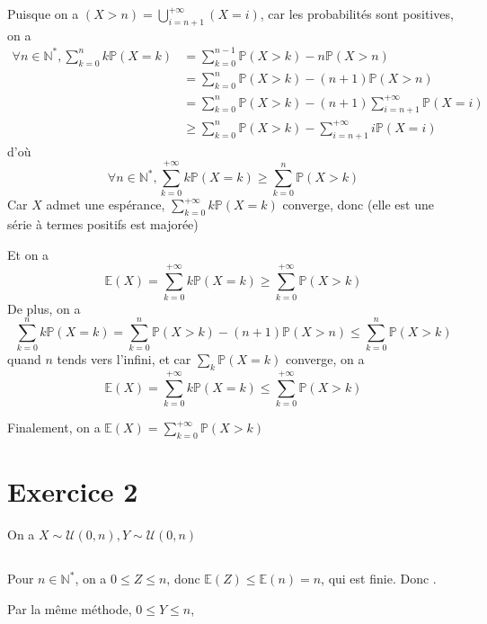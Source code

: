 \documentclass[a4paper,12pt]{book}
\begin{document}
Puisque on a $(X>n)=\bigcup_{i=n+1}^{+\infty}(X=i)$, car les probabilités sont positives, on a  
\begin{align*}
    \forall n \in \mathbb{N}^{*}, \sum_{k=0}^n k\mathbb{P}(X=k)&=\sum_{k=0}^{n-1}\mathbb{P}(X>k)-n\mathbb{P}(X>n)\\
                                 &=\sum_{k=0}^{n}\mathbb{P}(X>k)-(n+1)\mathbb{P}(X>n)\\
                                 &=\sum_{k=0}^{n}\mathbb{P}(X>k)-(n+1)\sum_{i=n+1}^{+\infty}\mathbb{P}(X=i)\\
                                 &\geq \sum_{k=0}^{n}\mathbb{P}(X>k)-\sum_{i=n+1}^{+\infty}i\mathbb{P}(X=i)
\end{align*}
d'où 
$$
\forall n \in \mathbb{N}^{*}, \sum_{k=0}^{+\infty} k\mathbb{P}(X=k) \geq \sum_{k=0}^{n}\mathbb{P}(X>k)
$$
Car $X$ admet une espérance, $\sum_{k=0}^{+\infty} k\mathbb{P}(X=k)$ converge, donc 
(elle est une série à termes positifs est majorée)

Et on a 
$$
\mathbb{E}(X)=\sum_{k=0}^{+\infty} k\mathbb{P}(X=k)\geq \sum_{k=0}^{+\infty} \mathbb{P}(X>k)
$$
De plus, on a 
$$
\sum_{k=0}^n k\mathbb{P}(X=k)=\sum_{k=0}^{n}\mathbb{P}(X>k)-(n+1)\mathbb{P}(X>n) \leq \sum_{k=0}^{n}\mathbb{P}(X>k)
$$
quand $n$ tends vers l'infini, et car $\sum_k \mathbb{P}(X=k)$ converge, on a 
$$
\mathbb{E}(X)=\sum_{k=0}^{+\infty} k\mathbb{P}(X=k)\leq \sum_{k=0}^{+\infty} \mathbb{P}(X>k)
$$

Finalement, on a $\boxed{\mathbb{E}(X)=\sum_{k=0}^{+\infty} \mathbb{P}(X>k)}$

\section{Exercice 2}
On a $X \sim \mathscr{U}(0,n), Y \sim \mathscr{U}(0,n)$
\subsection{}
Pour $n \in \mathbb{N}^{*}$, on a $0 \leq Z \leq n$, donc $\mathbb{E}(Z)\leq \mathbb{E}(n)=n$, qui est finie. 
Donc . 

Par la même méthode, $0 \leq Y \leq n$, 
\end{document}

